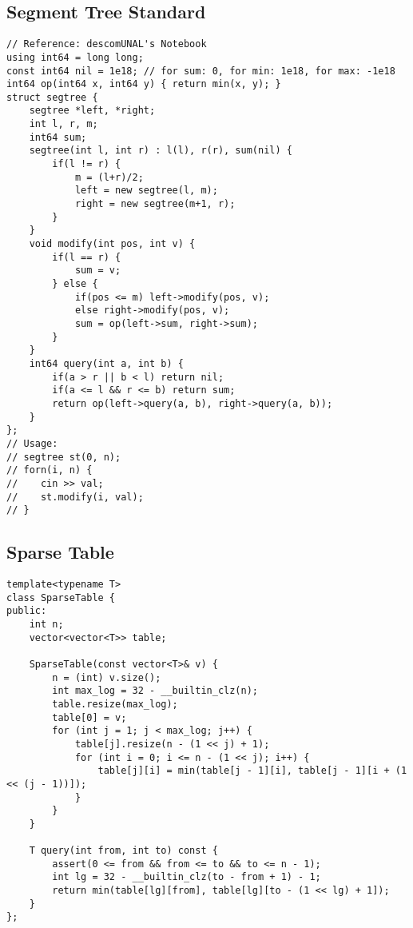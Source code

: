\documentclass[10pt,letterpaper,twocolumn,twosided]{article}
\begin{document}
\subsection{Segment Tree Standard}
\begin{lstlisting}
// Reference: descomUNAL's Notebook
using int64 = long long;
const int64 nil = 1e18; // for sum: 0, for min: 1e18, for max: -1e18
int64 op(int64 x, int64 y) { return min(x, y); }
struct segtree {
    segtree *left, *right;
    int l, r, m;
    int64 sum;
    segtree(int l, int r) : l(l), r(r), sum(nil) {
        if(l != r) {
            m = (l+r)/2;
            left = new segtree(l, m);
            right = new segtree(m+1, r);
        }
    }
    void modify(int pos, int v) {
        if(l == r) {
            sum = v;
        } else {
            if(pos <= m) left->modify(pos, v);
            else right->modify(pos, v);
            sum = op(left->sum, right->sum);
        }
    }
    int64 query(int a, int b) {
        if(a > r || b < l) return nil;
        if(a <= l && r <= b) return sum;
        return op(left->query(a, b), right->query(a, b));
    }
};
// Usage:
// segtree st(0, n);
// forn(i, n) {
//    cin >> val;
//    st.modify(i, val);
// }
\end{lstlisting}

\subsection{Sparse Table}
\begin{lstlisting}
template<typename T>
class SparseTable {
public:
    int n;
    vector<vector<T>> table;

    SparseTable(const vector<T>& v) {
        n = (int) v.size();
        int max_log = 32 - __builtin_clz(n);
        table.resize(max_log);
        table[0] = v;
        for (int j = 1; j < max_log; j++) {
            table[j].resize(n - (1 << j) + 1);
            for (int i = 0; i <= n - (1 << j); i++) {
                table[j][i] = min(table[j - 1][i], table[j - 1][i + (1 << (j - 1))]);
            }
        }
    }

    T query(int from, int to) const {
        assert(0 <= from && from <= to && to <= n - 1);
        int lg = 32 - __builtin_clz(to - from + 1) - 1;
        return min(table[lg][from], table[lg][to - (1 << lg) + 1]);
    }
};
\end{lstlisting}
\end{document}
